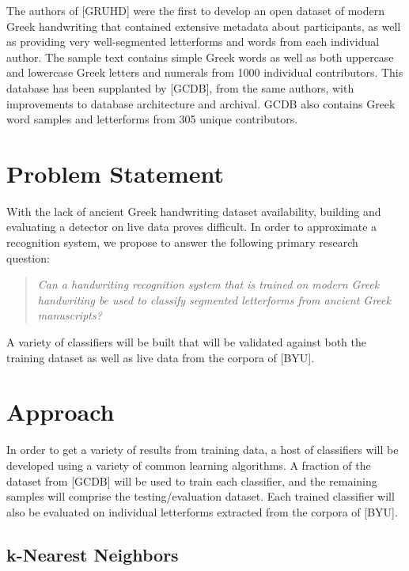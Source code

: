 \documentclass[10pt,twocolumn,letterpaper]{article}
\begin{document}
The authors of [GRUHD] were the first to develop an open dataset of modern Greek handwriting that contained extensive metadata about participants, as well as providing very well-segmented letterforms and words from each individual author. The sample text contains simple Greek words as well as both uppercase and lowercase Greek letters and numerals from 1000 individual contributors. This database has been supplanted by [GCDB], from the same authors, with improvements to database architecture and archival. GCDB also contains Greek word samples and letterforms from 305 unique contributors.

\section{Problem Statement}

With the lack of ancient Greek handwriting dataset availability, building and evaluating a detector on live data proves difficult. In order to approximate a recognition system, we propose to answer the following primary research question:

\begin{quote}
    \textit{Can a handwriting recognition system that is trained on modern Greek handwriting be used to classify segmented letterforms from ancient Greek manuscripts?}
\end{quote}

A variety of classifiers will be built that will be validated against both the training dataset as well as live data from the corpora of [BYU].

\section{Approach}

In order to get a variety of results from training data, a host of classifiers will be developed using a variety of common learning algorithms. A fraction of the dataset from [GCDB] will be used to train each classifier, and the remaining samples will comprise the testing/evaluation dataset. Each trained classifier will also be evaluated on individual letterforms extracted from the corpora of [BYU].

\subsection{k-Nearest Neighbors}
\end{document}
